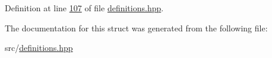 Definition at line \hyperlink{definitions_8hpp_source_l00107}{107} of file \hyperlink{definitions_8hpp_source}{definitions.\+hpp}.



The documentation for this struct was generated from the following file\+:\begin{DoxyCompactItemize}
\item 
src/\hyperlink{definitions_8hpp}{definitions.\+hpp}\end{DoxyCompactItemize}
